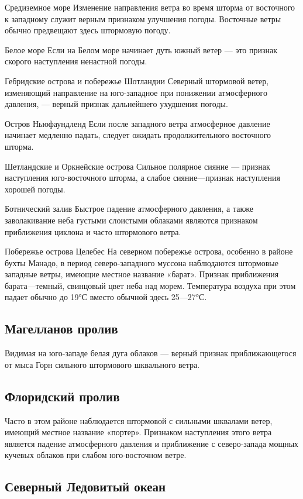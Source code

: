 Средиземное море
Изменение направления ветра во время шторма от восточного к западному служит верным признаком улучшения погоды. Восточные ветры обычно предвещают здесь штормовую погоду.

Белое море
Если на Белом море начинает дуть южный ветер — это признак скорого наступления ненастной погоды.

Гебридские острова и побережье Шотландии
Северный штормовой ветер, изменяющий направление на юго-западное при понижении атмосферного давления, — верный признак дальнейшего ухудшения погоды.

Остров Ньюфаундленд
Если после западного ветра атмосферное давление начинает медленно падать, следует ожидать продолжительного восточного шторма.

Шетландские и Оркнейские острова
Сильное полярное сияние — признак наступления юго-восточного шторма, а слабое сияние—признак наступления хорошей погоды.

Ботнический залив
Быстрое падение атмосферного давления, а также заволакивание неба густыми слоистыми облаками являются признаком приближения циклона и часто штормового ветра.

Побережье острова Целебес
На северном побережье острова, особенно в районе бухты Манадо, в период северо-западного муссона наблюдаются штормовые западные ветры, имеющие местное название «барат». Признак приближения барата—темный, свинцовый цвет неба над морем. Температура воздуха при этом падает обычно до 19°С вместо обычной здесь 25—27°С.

\subsection{Магелланов пролив}

Видимая на юго-западе белая дуга облаков — верный признак приближающегося от мыса Горн сильного штормового шквального ветра.

\subsection{Флоридский пролив}

Часто в этом районе наблюдается штормовой с сильными шквалами ветер, имеющий местное название «портер». Признаком наступления этого ветра является падение атмосферного давления и приближение с северо-запада мощных кучевых облаков при слабом юго-восточном ветре.

\subsection{Северный Ледовитый океан}

